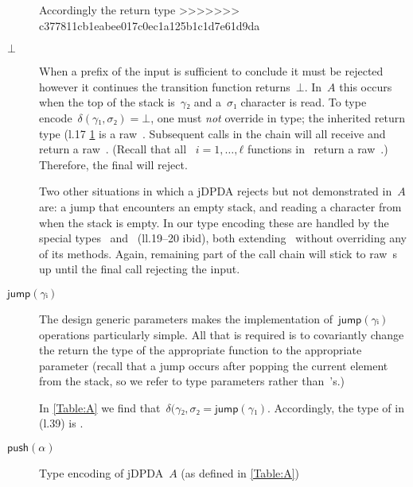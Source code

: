 \begin{description}
    Accordingly 
        the return type
>>>>>>> c377811cb1eabee017c0ec1a125b1c1d7e61d9da
  \item[$⊥$]
  When a prefix of the input is sufficient to conclude it must be rejected however it continues
  the transition function returns~$⊥$.
  In~$A$ this occurs when the top of the stack is~$γ₂$ and a~$σ₁$ character is read.
  To type encode~$δ(γ₁,σ₂) =⊥$, one must \emph{not} override  in type;
  the inherited return type (l.17 \cref{Figure:A} is a raw~.
  Subsequent calls in the chain will all receive and return a raw~.
  (Recall that all ~$i=1,…,ℓ$ functions in~ return a raw~.)
  Therefore, the final \cc{\$()} will reject.
  \par
  Two other situations in which a jDPDA rejects but not demonstrated in~$A$ are:
  a \textsf{jump} that encounters an empty stack, and reading a character from when the stack is empty.
  In our type encoding these are handled by the special
  types~ and~ (ll.19--20 ibid), both extending~ without
  overriding any of its methods. Again, remaining part of the call chain will stick to
  raw~s up until the final \cc{\$()} call rejecting the input.
  \item[$\textsf{jump}(γᵢ)$]
  The design generic parameters makes the implementation of~$\textsf{jump}(γᵢ)$
  operations particularly simple. All that is
  required is to covariantly change the return the
  type of the appropriate  function
  to the appropriate  parameter
  (recall that a jump occurs after popping the current element from the stack, so
  we refer to  type parameters rather than~'s.)
  \par
  In \cref{Table:A} we find that~$δ(γ₂,σ₂ =\textsf{jump}(γ₁)$. Accordingly, the type of 
  in  (l.39) is .
  \item[$\textsf{push}(α)$]
\end{description}

\begin{figure}
  \caption{\label{Figure:A}Type encoding of jDPDA~$A$ (as defined in \cref{Table:A})}
\end{figure}
